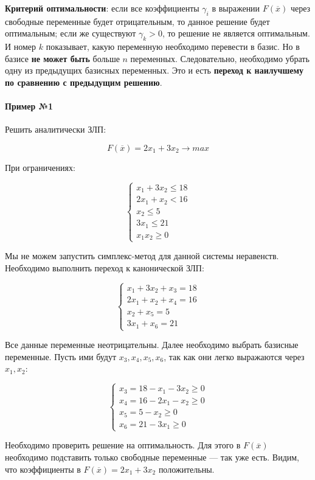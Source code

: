 \documentclass{article}
\begin{document}
\textbf{Критерий оптимальности}: если все коэффициенты $\gamma_{i}$ в выражении $F(\overline{x})$ через свободные переменные будет отрицательным, то данное решение будет оптимальным; если же существуют $\gamma_{k} > 0$, то решение не является оптимальным. И номер $k$ показывает, какую переменную необходимо перевести в базис. Но в базисе \textbf{не может быть} больше $n$ переменных. Следовательно, необходимо убрать одну из предыдущих базисных переменных. Это и есть \textbf{переход к наилучшему по сравнению с предыдущим решению}.

\paragraph{Пример №1}

Решить аналитически ЗЛП:

$$
F(\overline{x}) = 2x_1 + 3x_2 \to max
$$

При ограничениях:

$$
\begin{cases}
    x_1 + 3x_2 \le 18 \\
    2x_1 + x_2 < 16 \\
    x_2 \le 5 \\
    3x_1 \le 21 \\
    x_1 x_2 \ge 0  
\end{cases}
$$

Мы не можем запустить симплекс-метод для данной системы неравенств. Необходимо выполнить переход к канонической ЗЛП:

$$
\begin{cases}
  x_1 + 3x_2 + x_3 = 18 \\
  2x_1 + x_2 + x_4 = 16 \\
  x_2 + x_5 = 5 \\
  3x_1 + x_6 = 21  
\end{cases}
$$

Все данные переменные неотрицательны. Далее необходимо выбрать базисные переменные. Пусть ими будут $x_3, x_4, x_5, x_6$, так как они легко выражаются через $x_1, x_2$:

$$
\begin{cases}
    x_3 = 18 - x_1 - 3x_2 \ge 0 \\
    x_4 = 16 - 2x_1 - x_2 \ge 0 \\
    x_5 = 5 - x_2 \ge 0 \\
    x_6 = 21 - 3x_1 \ge 0
\end{cases}
$$

Необходимо проверить решение на оптимальность. Для этого в $F(\overline{x})$ необходимо подставить только свободные переменные — так уже есть. Видим, что коэффициенты в $F(\overline{x}) = 2x_1 + 3x_2$ положительны.
\end{document}
